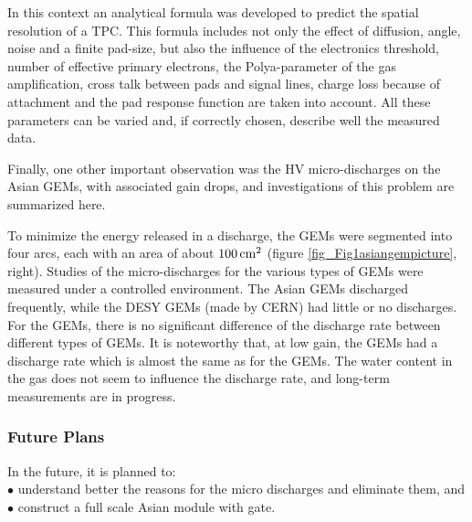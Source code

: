 In this context an analytical formula was developed to predict the spatial resolution of a TPC. This formula includes
not only the effect of diffusion, angle,
noise and a finite pad-size, but also the influence of the electronics threshold, number of effective primary electrons,
the Polya-parameter of the gas
amplification, cross talk between pads and signal lines, charge loss because of attachment and the pad response function
are taken into account. All
these parameters can be varied and, if correctly chosen, describe well the measured data.

Finally, one other important observation was the HV micro-discharges on the Asian GEMs, with associated gain drops,
and investigations of this problem are summarized here.

To minimize the energy released in a discharge, the GEMs were segmented into four arcs, each with an area of
about $\unit[100]{cm^2}$ (figure \ref{fig_Fig1asiangempicture}, right).
Studies of the micro-discharges for the various types of GEMs were measured under a controlled environment.
The \unit[100]{\micron} Asian GEMs discharged frequently, while the DESY \unit[50]{\micron} GEMs (made by CERN) had little or no
discharges. For the \unit[50]{\micron} GEMs, there is no significant difference of
the discharge rate between different types of GEMs. It is noteworthy that, at low gain, the \unit[100]{\micron} GEMs
had a discharge rate which is almost the same as for the \unit[50]{\micron} GEMs. The water content in the gas does not seem to
influence the
discharge rate, and long-term measurements are in progress.


\subsubsection{Future Plans}

In the future, it is planned to:\\
$\bullet$ understand better the reasons for the micro discharges and eliminate them, and \\
$\bullet$ construct a full scale Asian module with gate.
